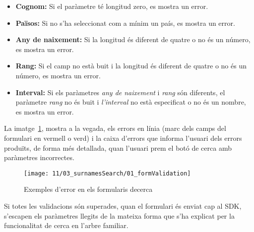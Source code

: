 \begin{itemize}
    \item \textbf{Cognom:} Si el paràmetre té longitud zero, es mostra un error.
    \item \textbf{Països:} Si no s'ha seleccionat com a mínim un país, es mostra un error.
    \item \textbf{Any de naixement:} Si la longitud és diferent de quatre o no és un número, es mostra un error.
    \item \textbf{Rang:} Si el camp no està buit i la longitud és diferent de quatre o no és un número, es mostra un error.
    \item \textbf{Interval:} Si els paràmetres \emph{any de naixement} i \emph{rang} són diferents, el paràmetre \emph{rang} no és buit i \emph{l’interval} no està especificat o no és un nombre, es mostra un error.
\end{itemize}

La imatge~\ref{fig:surnamesError}, mostra a la vegada, els errors en línia (marc dels camps del formulari en vermell o verd) i la caixa d'errors que informa l'usuari dels errors produïts, de forma més detallada, quan l’usuari prem el botó de cerca amb paràmetres incorrectes.

\begin{figure}[h]
    \texttt{[image: 11/03\_surnamesSearch/01\_formValidation]}
    \centering
    \caption{Exemples d'error en els formularis decerca}\label{fig:surnamesError}
\end{figure}

Si totes les validacions són superades, quan el formulari és enviat cap al SDK, s'escapen els paràmetres llegits de la mateixa forma que s'ha explicat per la funcionalitat de cerca en l’arbre familiar.
